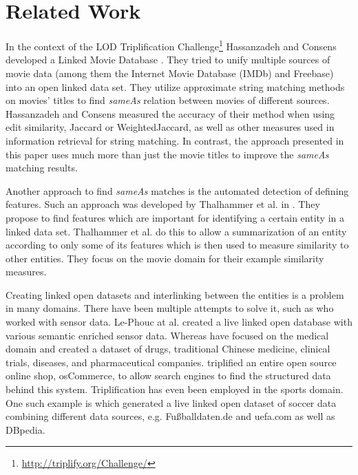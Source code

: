 \section{Related Work}
\label{sec_related_work}


In the context of the LOD Triplification Challenge\footnote{\url{http://triplify.org/Challenge/}} Hassanzadeh and Consens developed a Linked Movie Database \cite{LMDB}.
They tried to unify multiple sources of movie data (among them the Internet Movie Database (IMDb) and Freebase) into an open linked data set.
They utilize approximate string matching methods on movies' titles to find \textit{sameAs} relation between movies of different sources.
Hassanzadeh and Consens measured the accuracy of their method when using edit similarity, Jaccard or WeightedJaccard, as well as other measures used in information retrieval for string matching.
In contrast, the approach presented in this paper uses much more than just the movie titles to improve the \textit{sameAs} matching results.

Another approach to find \textit{sameAs} matches is the automated detection of defining features.
Such an approach was developed by Thalhammer et al. in \cite{MovieSummarization}.
They propose to find features which are important for identifying a certain entity in a linked data set.
Thalhammer et al. do this to allow a summarization of an entity according to only some of its features which is then used to measure similarity to other entities.
They focus on the movie domain for their example similarity measures.

Creating linked open datasets and interlinking between the entities is a problem in many domains.
There have been multiple attempts to solve it, such as \cite{SensorData} who worked with sensor data.
Le-Phouc at al. created a live linked open database with various semantic enriched sensor data.
Whereas \cite{openDrugData} have focused on the medical domain and created a dataset of drugs, traditional Chinese medicine, clinical trials, diseases, and pharmaceutical companies.
\cite{osCommerce} triplified an entire open source online shop, osCommerce, to allow search engines to find the structured data behind this system.
Triplification has even been employed in the sports domain.
One such example is \cite{smm} which generated a live linked open dataset of soccer data combining different data sources, e.g. Fußballdaten.de and uefa.com as well as DBpedia.


